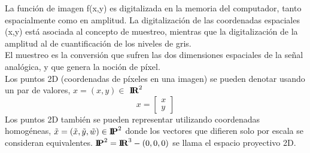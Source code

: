La función de imagen f(x,y) es digitalizada en la memoria del computador, tanto
espacialmente como en amplitud. La digitalización de las coordenadas espaciales (x,y)
está asociada al concepto de muestreo, mientras que la digitalización de la amplitud al
de cuantificación de los niveles de gris.\cite{Book:Jose2005}
\\El muestreo es la conversión que sufren las dos dimensiones espaciales de la
señal analógica, y que genera la noción de píxel.\\
Los puntos 2D (coordenadas de píxeles en una imagen) se pueden denotar usando un par de valores, $x = (x,y) \in$ ${\textbf{I\!R}^2}$\cite{Book:Richard2011}
\begin{equation}
	x = \left[
		\begin{array}{c}
			x \\
			y
		\end{array}
		\right]
\end{equation}
Los puntos 2D también se pueden representar utilizando coordenadas homogéneas, $\tilde{x} = (\tilde{x},\tilde{y}, \tilde{w}) \in {\textbf{I\!P}^2}$
donde los vectores que difieren solo por escala se consideran equivalentes. ${\textbf{I\!P}^2} = {\textbf{I\!R}^3} -  (0,0,0) $ se llama el espacio proyectivo 2D.


